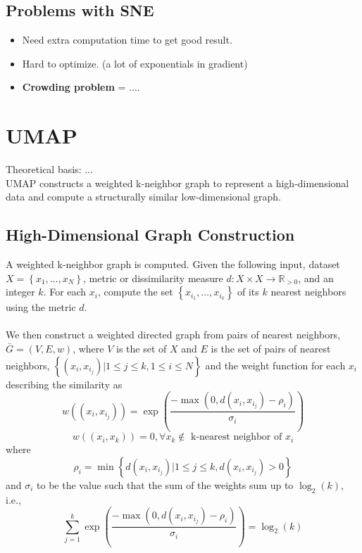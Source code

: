 \documentclass[runningheads]{llncs}
\begin{document}
	\subsection{Problems with SNE}
	\begin{itemize}
		\item Need extra computation time to get good result.
		\item Hard to optimize. (a lot of exponentials in gradient)
		\item \textbf{Crowding problem} = ....
	\end{itemize}
	\newpage
	\section{UMAP}
	Theoretical basis: ...\\
	UMAP constructs a weighted k-neighbor graph to represent a high-dimensional data and compute a structurally similar low-dimensional graph.
	\subsection{ High-Dimensional Graph Construction}
	A weighted k-neighbor graph is computed. Given the following input, dataset $X=\left\{x_{1}, \ldots, x_{N}\right\}$,
	metric or dissimilarity measure $d: X \times X \rightarrow \mathbb{R}_{>0}$, and an integer $k$. For each $x_i$, compute the set  \(\left\{x_{i_{1}}, \dots, x_{i_{k}}\right\}\) of its $k$ nearest neighbors using the metric $d$.\\
	\\
	We then construct a weighted directed graph from pairs of nearest neighbors, \(\bar{G}=(V, E, w)\), where $V$ is the set of $X$ and $E$ is the set of pairs of nearest neighbors, \(\left\{\left(x_{i}, x_{i_{j}}\right) | 1 \leq j \leq k, 1 \leq i \leq N\right\}\) and the weight function for each $x_i$ describing the similarity as $$w\left(\left(x_{i}, x_{i_{j}}\right)\right)=\exp \left(\frac{-\max \left(0, d\left(x_{i}, x_{i_{j}}\right)-\rho_{i}\right)}{\sigma_{i}}\right)$$ 
	$$w ((x_i, x_k)) = 0 , \forall x_k \notin \text{ k-nearest neighbor of }x_i$$
	where
	$$ \rho_{i}=\min \left\{d\left(x_{i}, x_{i_{j}}\right) | 1 \leq j \leq k, d\left(x_{i}, x_{i_{j}}\right)>0\right\}$$ and \(\sigma_{i}\) to be the value such that the sum of the weights sum up to $\log_2(k)$, i.e.,
	$$ \sum_{j=1}^{k} \exp \left(\frac{-\max \left(0, d\left(x_{i}, x_{i_{j}}\right)-\rho_{i}\right)}{\sigma_{i}}\right)=\log _{2}(k)$$
	
\end{document}
